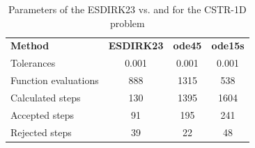 \begin{table}[H]
    \centering
    \begin{tabular}{@{}l|c|c|c@{}}
    \toprule
    \textbf{Method}      & \multicolumn{1}{c|}{\textbf{ESDIRK23}} & \multicolumn{1}{c|}{\textbf{ode45}} & \multicolumn{1}{c}{\textbf{ode15s}} \\
    Tolerances           & 0.001                                  & 0.001                               & 0.001                               \\ \midrule
    Function evaluations & 888                                    & 1315                                & 538                                 \\
    Calculated steps     & 130                                    & 1395                                & 1604                                \\
    Accepted steps       & 91                                     & 195                                 & 241                                 \\
    Rejected steps       & 39                                     & 22                                  & 48                                  \\ \bottomrule
    \end{tabular}
    \caption{Parameters of the ESDIRK23 vs.  and  for the CSTR-1D problem}
    \label{8_6_1D_table}
\end{table}

